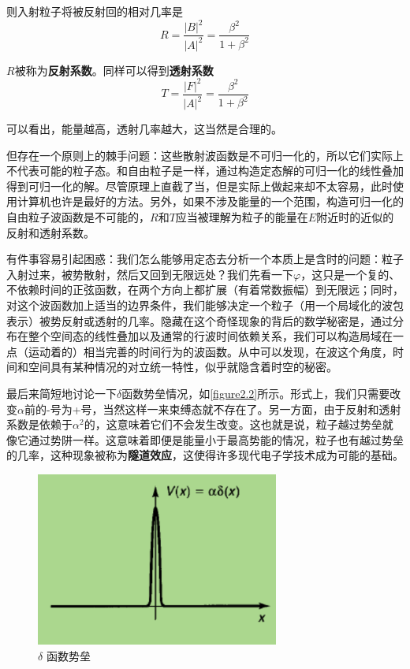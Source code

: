 \documentclass[UTF8]{ctexart}
\begin{document}
\noindent 则入射粒子将被反射回的相对几率是
\begin{equation}
    R = \frac{|B|^2}{|A|^2} = \frac{\beta^2}{1+\beta^2}
\end{equation}

\noindent $R$被称为\textbf{反射系数}。同样可以得到\textbf{透射系数}
\begin{equation}
    T = \frac{|F|^2}{|A|^2} = \frac{\beta^2}{1 +\beta^2}
\end{equation}

\noindent 可以看出，能量越高，透射几率越大，这当然是合理的。

    但存在一个原则上的棘手问题：这些散射波函数是不可归一化的，所以它们实际上不代表可能的粒子态。和自由粒子是一样，通过构造定态解的可归一化的线性叠加得到可归一化的解。尽管原理上直截了当，但是实际上做起来却不太容易，此时使用计算机也许是最好的方法。另外，如果不涉及能量的一个范围，构造可归一化的自由粒子波函数是不可能的，$R$和$T$应当被理解为粒子的能量在$E$附近时的近似的反射和透射系数。

    有件事容易引起困惑：我们怎么能够用定态去分析一个本质上是含时的问题：粒子入射过来，被势散射，然后又回到无限远处？我们先看一下$\varphi$，这只是一个复的、不依赖时间的正弦函数，在两个方向上都扩展（有着常数振幅）到无限远；同时，对这个波函数加上适当的边界条件，我们能够决定一个粒子（用一个局域化的波包表示）被势反射或透射的几率。隐藏在这个奇怪现象的背后的数学秘密是，通过分布在整个空间态的线性叠加以及通常的行波时间依赖关系，我们可以构造局域在一点（运动着的）相当完善的时间行为的波函数。从中可以发现，在波这个角度，时间和空间具有某种情况的对立统一特性，似乎就隐含着时空的秘密。

    最后来简短地讨论一下$\delta$函数势垒情况，如\autoref{figure2.2}所示。形式上，我们只需要改变$\alpha$前的-号为+号，当然这样一来束缚态就不存在了。另一方面，由于反射和透射系数是依赖于$\alpha^2$的，这意味着它们不会发生改变。这也就是说，粒子越过势垒就像它通过势阱一样。这意味着即便是能量小于最高势能的情况，粒子也有越过势垒的几率，这种现象被称为\textbf{隧道效应}，这使得许多现代电子学技术成为可能的基础。

    \begin{figure}[htb]
        \centering
        \includegraphics[width=8cm]{figure2-2.png}
        \caption{$\delta$ 函数势垒}
        \label{figure2.2}
    \end{figure}
\end{document}
